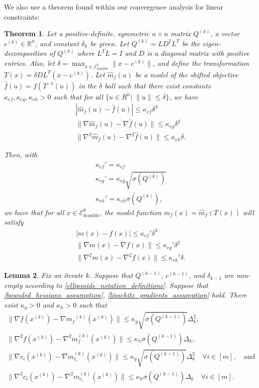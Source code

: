 \documentclass{article}
\newtheorem{theorem}{Theorem}[section]
\newtheorem{lemma}[theorem]{Lemma}
\theoremstyle{case}
\numberwithin{theorem}{subsection}
\newcommand{\ck}{{c^{(k)}}}
\newcommand{\dk}{\Delta_k}
\newcommand{\gmcik}{{\nabla m_{c_i}^{(k)}\left(\xk\right)}}
\newcommand{\gradf}{\nabla f}
\newcommand{\hk}{{\nabla^2m_f^{(k)}\left(\xk\right)}}
\newcommand{\mfk}{{{m}_f}^{(k)}}
\newcommand{\qk}{{Q^{(k)}}}
\newcommand{\Rn}{\mathbb R^n}
\newcommand{\sdk}{{\delta_k}}
\newcommand{\unshiftedellipsoid}{{\mathcal E^k_{\textrm{feasible}}}}
\newcommand{\xk}{x^{(k)}}
\newcommand{\qkmo}{{Q^{(k-1)}}}
\newcommand{\ckmo}{{c^{(k-1)}}}
\newcommand{\sdkmo}{{\delta_{k-1}}}
\begin{document}
We also use a theorem found within our convergence analysis for linear constraints:
\begin{theorem}
\label{shifted_ellipsoid}
Let a positive-definite, symmetric $n\times n$ matrix $\qk$, a vector $\ck \in \Rn$, and constant $\sdk$ be given.
Let $\qk = L D^2 L^T$ be the eigen-decomposition of $\qk$ where $L^TL = I$ and $D$ is a diagonal matrix with positive entries.
Also, let $\delta = \max_{x\in \unshiftedellipsoid}\|x-\ck\|$, 
and define the transformation $T(x) = \delta DL^T(x - \ck)$.
Let $\hat m_f(u)$ be a model of the shifted objective $\hat f(u) = f(T^{-1}(u))$ in the $\delta$ ball such that
there exist constants $\kappa_{ef}, \kappa_{eg}, \kappa_{eh} > 0$ such that for all $\{u \in R^n | \;\|u\| \le \delta \}$, we have
\begin{align*}
|\hat m_f(u) - \hat f(u)| \le \kappa_{ef} \delta^3\\
\|\nabla \hat m_f(u) - \nabla \hat f(u)\| \le \kappa_{eg}\delta^2\\
\|\nabla^2 \hat m_f(u) - \nabla^2 \hat f(u)\| \le \kappa_{eh}\delta.
\end{align*}

Then, with
\begin{align*}
\kappa_{ef}' = \kappa_{ef} \\
\kappa_{eg}' = \kappa_{eg}\sqrt{\sigma(\qk)} \\
\kappa_{eh}' = \kappa_{eh}\sigma(\qk),
\end{align*}
we have that for all $x \in \unshiftedellipsoid$,
the model function $m_f(x) = \hat m_f(T(x))$ will satisfy
\begin{align*}
| m(x) - f(x)| \le \kappa_{ef}'\delta^3 \\
\|\nabla  m(x) - \nabla  f(x)\| \le \kappa_{eg}'\delta^2 \\
\|\nabla^2 m(x) - \nabla^2 f(x)\| \le \kappa_{eh}'\delta.
\end{align*}
\end{theorem}


\begin{lemma}
\label{accuracy_is_satisfied_lemma}
Fix an iterate $k$.
Suppose that $\qkmo$, $\ckmo$, and $\sdkmo$ are non-empty according to \cref{ellipsoids_notation_definitions}.
Suppose that \cref{bounded_hessians_assumption}, \cref{lipschitz_gradients_assumption} hold.
There exist $\kappa_g>0$ and $\kappa_h>0$ such that
\begin{align*}
\|\gradf(\xk) - \nabla \mfk(\xk) \| \le \kappa_g \sqrt{\sigma \left(\qkmo\right)} \dk^2, \\
\|\nabla^2 f(\xk) - \hk \| \le \kappa_h \sigma \left(\qkmo\right) \dk,  \\
\|\nabla c_i(\xk) - \gmcik \| \le \kappa_g \sqrt{\sigma \left(\qkmo\right)} \dk^2 \quad \forall i \in [m], \quad \textrm{and}\\
\|\nabla^2 c_i(\xk) - \nabla^2 m_{c_i}^{(k)}(\xk) \| \le \kappa_h \sigma \left(\qkmo\right) \dk \quad \forall i \in [m]. \\
\end{align*}
\end{lemma}
\end{document}
